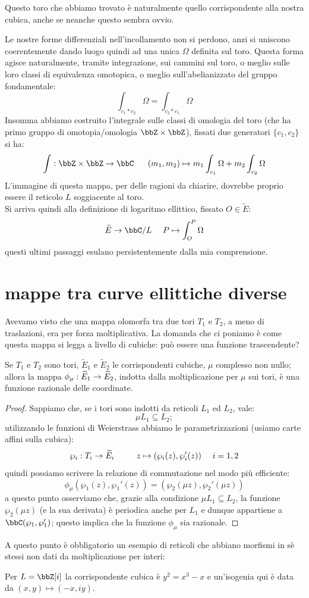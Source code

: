 Questo toro che abbiamo trovato è naturalmente quello corrispondente alla nostra cubica, anche se neanche questo sembra ovvio.

Le nostre forme differenziali nell'incollamento non si perdono, anzi si uniscono coerentemente dando luogo quindi ad una unica $\Omega$ definita sul toro.
Questa forma agisce naturalmente, tramite integrazione, sui cammini sul toro, o meglio sulle loro classi di equivalenza omotopica, o meglio sull'abelianizzato del gruppo fondamentale:
$$
\int_{c_1 * c_2} \Omega=\int_{c_2 * c_1} \Omega
$$ 
Insomma abbiamo costruito l'integrale sulle classi di omologia del toro (che ha primo gruppo di omotopia/omologia $\bbZ\times \bbZ $), fissati due generatori $\{c_1,c_2\}$ si ha:
$$
\int: \bbZ\times \bbZ \rar \bbC \ \ \ \ \ (m_1,m_2)\mapsto m_1 \int_{c_1} \Omega+m_2 \int_{c_2} \Omega  
$$
L'immagine di questa mappa, per delle ragioni da chiarire, dovrebbe proprio essere il reticolo $L$ soggiacente al toro.\\
Si arriva quindi alla definizione di logaritmo ellittico, fissato $O\in \widetilde{E}$:
$$
\widetilde{E}\rar \bbC/L\ \ \ \ P\mapsto \int_O^P \Omega  
$$
questi ultimi passaggi esulano persistentemente dalla mia comprensione.
\section{mappe tra curve ellittiche diverse}
Avevamo visto che una mappa olomorfa tra due tori $T_1$ e $T_2$, a meno di traslazioni, era per forza moltiplicativa. La domanda che ci poniamo è come questa mappa si legga a livello di cubiche: può essere una funzione trascendente?
\begin{proposizione}
Se $T_1$ e $T_2$ sono tori, $\widetilde{E}_1$ e $\widetilde{E}_2$ le corrispondenti cubiche, $\mu$ complesso non nullo; allora la mappa $\phi_\mu:\widetilde{E}_1\rightarrow\widetilde{E}_2$, indotta dalla moltiplicazione per $\mu$ sui tori, è una funzione razionale delle coordinate.
\end{proposizione}
\begin{proof}
Sappiamo che, se i tori sono indotti da reticoli $L_1$ ed $L_2$, vale:
$$
\mu L_1\subseteq L_2;
$$
utilizzando le funzioni di Weierstrass abbiamo le parametrizzazioni (usiamo carte affini sulla cubica):
$$
\wp_i:T_i\rightarrow \widetilde{E}_i \qquad \ \ z \mapsto (\wp_i(z),\wp_i'(z))\ \ \ \ i=1,2
$$
quindi possiamo scrivere la relazione di commutazione nel modo più efficiente:
$$
\phi_\mu(\wp_1(z),\wp_1'(z))=(\wp_2(\mu z),\wp_2'(\mu z))
$$
a questo punto osserviamo che, grazie alla condizione $\mu L_1\subseteq L_2$, la funzione $\wp_2(\mu z)$ (e la sua derivata) è periodica anche per $L_1$ e dunque appartiene a $\bbC(\wp_1,\wp_1')$; questo implica che la funzione $\phi_\mu$ sia razionale.
\end{proof}
A questo punto è obbligatorio un esempio di reticoli che abbiano morfismi in sè stessi non dati da moltiplicazione per interi:
\begin{fatto}
Per $L=\bbZ[i]$ la corrispondente cubica è $y^2=x^3-x$ e un'isogenia qui è data da $(x,y)\mapsto (-x,iy)$.
\end{fatto}
